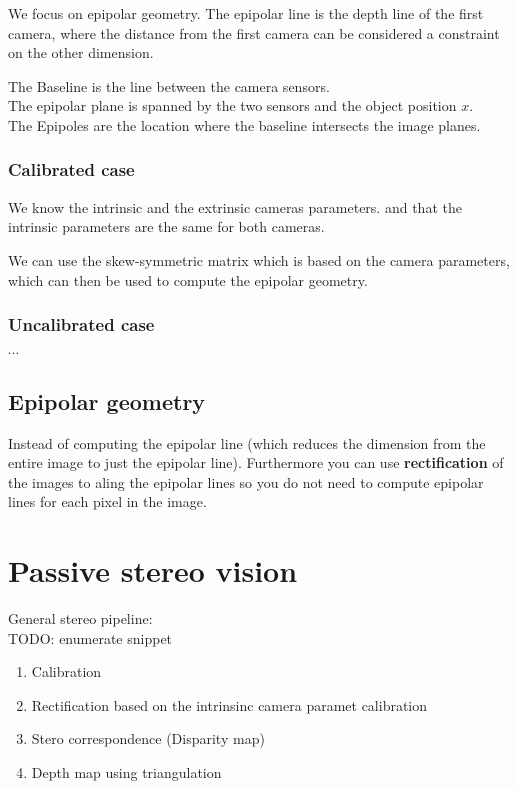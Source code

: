 \documentclass[a4paper]{article}
\begin{document}
We focus on epipolar geometry. 
The epipolar line is the depth line of the first camera, where the distance from the first camera can be considered a constraint on the other dimension.


The Baseline is the line between the camera sensors. \\
The epipolar plane is spanned by the two sensors and the object position $ x $.\\
The Epipoles are the location where the baseline intersects the image planes. 


\subsubsection{Calibrated case}
We know the intrinsic and the extrinsic cameras parameters. and that the intrinsic parameters are the same for both cameras.

We can use the skew-symmetric matrix which is based on the camera parameters, which can then be used to compute the epipolar geometry.

\subsubsection{Uncalibrated case}
$ \cdots  $

\subsection{Epipolar geometry}
Instead of computing the epipolar line (which reduces the dimension from the entire image to just the epipolar line). Furthermore you can use \textbf{rectification} of the images to aling the epipolar lines so you do not need to compute epipolar lines for each pixel in the image. 


\section{Passive stereo vision}
General stereo pipeline: \\
TODO: enumerate snippet
\begin{enumerate}
	\item Calibration
	\item Rectification based on the intrinsinc camera paramet calibration
	\item Stero correspondence (Disparity map)
	\item Depth map using triangulation
\end{enumerate}
\end{document}

